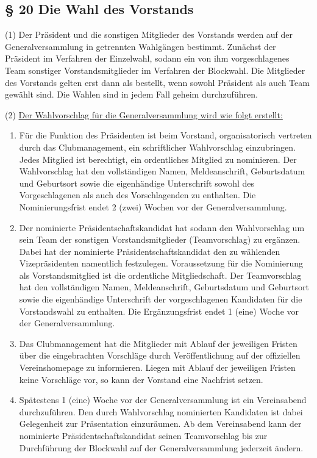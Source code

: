 \documentclass[11pt,a4paper]{article}
\begin{document}
\subsection{§ 20
Die Wahl des Vorstands}

(1)
Der Präsident und die sonstigen Mitglieder des Vorstands werden auf der Generalversammlung in getrennten Wahlgängen bestimmt.
Zunächst der Präsident im Verfahren der Einzelwahl, sodann ein von ihm vorgeschlagenes Team sonstiger Vorstandsmitglieder im Verfahren der Blockwahl.
Die Mitglieder des Vorstands gelten erst dann als bestellt, wenn sowohl Präsident als auch Team gewählt sind.
Die Wahlen sind in jedem Fall geheim durchzuführen.

(2)
\underline{Der Wahlvorschlag für die Generalversammlung wird wie folgt erstellt:}

\begin{enumerate}[label=\alph*)]
\item
Für die Funktion des Präsidenten ist beim Vorstand, organisatorisch vertreten durch das Clubmanagement, ein schriftlicher Wahlvorschlag einzubringen.
Jedes Mitglied ist berechtigt, ein ordentliches Mitglied zu nominieren.
Der Wahlvorschlag hat den vollständigen Namen, Meldeanschrift, Geburtsdatum und Geburtsort sowie die eigenhändige Unterschrift sowohl des Vorgeschlagenen als auch des Vorschlagenden zu enthalten.
Die Nominierungsfrist endet 2 (zwei) Wochen vor der Generalversammlung.
\item
Der nominierte Präsidentschaftskandidat hat sodann den Wahlvorschlag um sein Team der sonstigen Vorstandsmitglieder (Teamvorschlag) zu ergänzen.
Dabei hat der nominierte Präsidentschaftskandidat den zu wählenden Vizepräsidenten namentlich festzulegen.
Voraussetzung für die Nominierung als Vorstandsmitglied ist die ordentliche Mitgliedschaft.
Der Teamvorschlag hat den vollständigen Namen, Meldeanschrift, Geburtsdatum und Geburtsort sowie die eigenhändige Unterschrift der vorgeschlagenen Kandidaten für die Vorstandswahl zu enthalten.
Die Ergänzungsfrist endet 1 (eine) Woche vor der Generalversammlung.
\item
Das Clubmanagement hat die Mitglieder mit Ablauf der jeweiligen Fristen über die eingebrachten Vorschläge durch Veröffentlichung auf der offiziellen Vereinshomepage zu informieren.
Liegen mit Ablauf der jeweiligen Fristen keine Vorschläge vor, so kann der Vorstand eine Nachfrist setzen.
\item
Spätestens 1 (eine) Woche vor der Generalversammlung ist ein Vereinsabend durchzuführen.
Den durch Wahlvorschlag nominierten Kandidaten ist dabei Gelegenheit zur Präsentation einzuräumen.
Ab dem Vereinsabend kann der nominierte Präsidentschaftskandidat seinen Teamvorschlag bis zur Durchführung der Blockwahl auf der Generalversammlung jederzeit ändern.
\end{enumerate}
\end{document}
